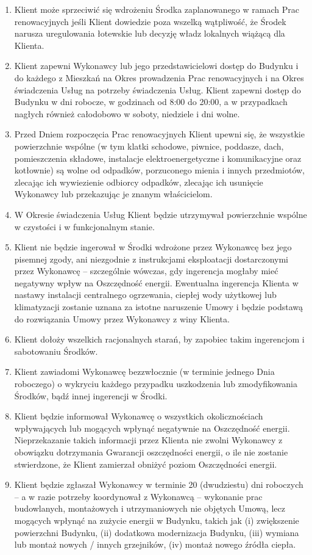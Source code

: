 \begin{multicols}{2}
\begin{enumerate}
	\item Klient może sprzeciwić się wdrożeniu Środka zaplanowanego w ramach Prac renowacyjnych jeśli Klient dowiedzie poza wszelką wątpliwość, że Środek narusza uregulowania łotewskie lub decyzję władz lokalnych wiążącą dla Klienta.
	\item Klient zapewni Wykonawcy lub jego przedstawicielowi dostęp do Budynku i do każdego z Mieszkań na Okres prowadzenia Prac renowacyjnych i na Okres świadczenia Usług na potrzeby świadczenia Usług. Klient zapewni dostęp do Budynku w dni robocze, w godzinach od 8:00 do 20:00, a w przypadkach nagłych również całodobowo w soboty, niedziele i dni wolne.
	\item Przed Dniem rozpoczęcia Prac renowacyjnych Klient upewni się, że wszystkie powierzchnie wspólne (w tym klatki schodowe, piwnice, poddasze, dach, pomieszczenia składowe, instalacje elektroenergetyczne i komunikacyjne oraz kotłownie) są wolne od odpadków, porzuconego mienia i innych przedmiotów, zlecając ich wywiezienie odbiorcy odpadków, zlecając ich usunięcie Wykonawcy lub przekazując je znanym właścicielom.
	\item W Okresie świadczenia Usług Klient będzie utrzymywał powierzchnie wspólne w czystości i w funkcjonalnym stanie.
	\item Klient nie będzie ingerował w Środki wdrożone przez Wykonawcę bez jego pisemnej zgody, ani niezgodnie z instrukcjami eksploatacji dostarczonymi przez Wykonawcę – szczególnie wówczas, gdy ingerencja mogłaby mieć negatywny wpływ na Oszczędność energii. Ewentualna ingerencja Klienta w nastawy instalacji centralnego ogrzewania, ciepłej wody użytkowej lub klimatyzacji zostanie uznana za istotne naruszenie Umowy i będzie podstawą do rozwiązania Umowy przez Wykonawcy z winy Klienta.
	\item Klient dołoży wszelkich racjonalnych starań, by zapobiec takim ingerencjom i sabotowaniu Środków.
	\item Klient zawiadomi Wykonawcę bezzwłocznie (w terminie jednego Dnia roboczego) o wykryciu każdego przypadku uszkodzenia lub zmodyfikowania Środków, bądź innej ingerencji w Środki.
	\item Klient będzie informował Wykonawcę o wszystkich okolicznościach wpływających lub mogących wpłynąć negatywnie na Oszczędność energii. Nieprzekazanie takich informacji przez Klienta nie zwolni Wykonawcy z obowiązku dotrzymania Gwarancji oszczędności energii, o ile nie zostanie stwierdzone, że Klient zamierzał obniżyć poziom Oszczędności energii.
	\item Klient będzie zgłaszał Wykonawcy w terminie 20 (dwudziestu) dni roboczych – a w razie potrzeby koordynował z Wykonawcą – wykonanie prac budowlanych, montażowych i utrzymaniowych nie objętych Umową, lecz mogących wpłynąć na zużycie energii w Budynku, takich jak (i) zwiększenie powierzchni Budynku, (ii) dodatkowa modernizacja Budynku, (iii) wymiana lub montaż nowych / innych grzejników, (iv) montaż nowego źródła ciepła.

\end{enumerate}
\end{multicols}
